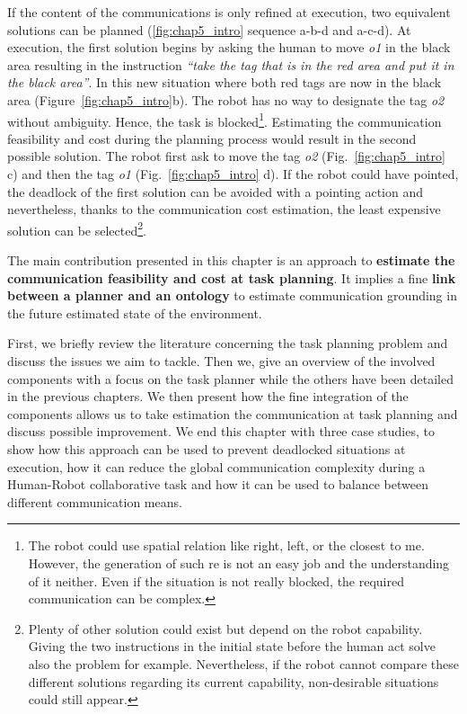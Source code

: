 If the content of the communications is only refined at execution, two equivalent solutions can be planned (\ref{fig:chap5_intro} sequence a-b-d and a-c-d). At execution, the first solution begins by asking the human to move \textit{o1} in the black area resulting in the instruction \textit{``take the tag that is in the red area and put it in the black area''}. In this new situation where both red tags are now in the black area (Figure~\ref{fig:chap5_intro}b). The robot has no way to designate the tag \textit{o2} without ambiguity. Hence, the task is blocked\footnote{The robot could use spatial relation like right, left, or the closest to me. However, the generation of such \acrshort{re} is not an easy job and the understanding of it neither. Even if the situation is not really blocked, the required communication can be complex. }. Estimating the communication feasibility and cost during the planning process would result in the second possible solution. The robot first ask to move the tag \textit{o2} (Fig.~\ref{fig:chap5_intro} c) and then the tag \textit{o1} (Fig.~\ref{fig:chap5_intro} d). If the robot could have pointed, the deadlock of the first solution can be avoided with a pointing action and nevertheless, thanks to the communication cost estimation, the least expensive solution can be selected\footnote{Plenty of other solution could exist but depend on the robot capability. Giving the two instructions in the initial state before the human act solve also the problem for example. Nevertheless, if the robot cannot compare these different solutions regarding its current capability, non-desirable situations could still appear.}.

The main contribution presented in this chapter is an approach to \textbf{estimate the communication feasibility and cost at task planning}. It implies a fine \textbf{link between a planner and an ontology} to estimate communication grounding in the future estimated state of the environment.

First, we briefly review the literature concerning the task planning problem and discuss the issues we aim to tackle. Then we, give an overview of the involved components with a focus on the task planner while the others have been detailed in the previous chapters. We then present how the fine integration of the components allows us to take estimation the communication at task planning and discuss possible improvement. We end this chapter with three case studies, to show how this approach can be used to prevent deadlocked situations at execution, how it can reduce the global communication complexity during a Human-Robot collaborative task and how it can be used to balance between different communication means.

